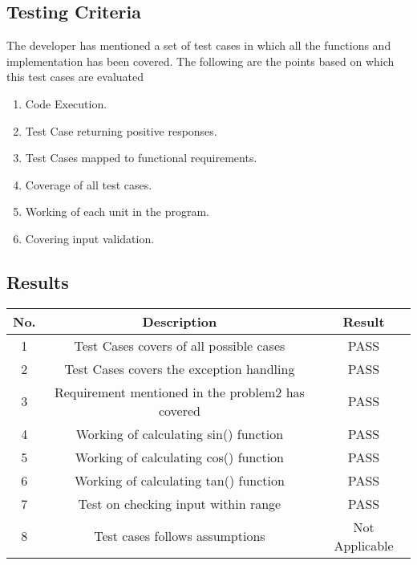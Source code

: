 \documentclass[a4paper,12pt]{article}
\begin{document}
    \subsection{Testing Criteria}
        The developer has mentioned a set of test cases in which all the functions and implementation has been covered. The following are the points based on which this test cases are evaluated
        \begin{enumerate}
            \item Code Execution.
            \item Test Case returning positive responses.
            \item Test Cases mapped to functional requirements.
            \item Coverage of all test cases.
            \item Working of each unit in the program.
            \item Covering input validation.
        \end{enumerate}
        
    \subsection{Results}
        \begin{center}
        \begin{tabular}{||c c c||} 
         \hline
         No. & Description & Result \\ 
         \hline\hline
         1 & Test Cases covers of all possible cases & PASS \\ 
         \hline
         2 & Test Cases covers the exception handling & PASS \\
         \hline
         3 & Requirement mentioned in the problem2 has covered & PASS \\
         \hline
         4 & Working of calculating sin() function & PASS \\
         \hline
         
         \hline
         5 & Working of calculating cos() function & PASS \\
         \hline
         
         \hline
         6 & Working of calculating tan() function & PASS \\
         \hline
         7 & Test on checking input within range & PASS \\
         \hline
         8 & Test cases follows assumptions & Not Applicable \\
         \hline
        \end{tabular}
        \end{center}
        
\end{document}
